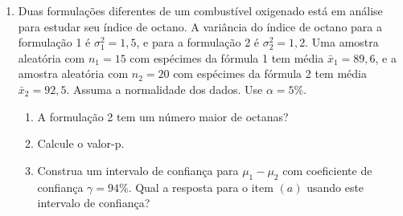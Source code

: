 \documentclass[8pt, a4paper]{article}
\begin{document}
\begin{enumerate}
	\item Duas formulações diferentes de um combustível oxigenado está em análise para estudar seu índice de octano. A variância  do índice de octano para a formulação 1 é $\sigma_1^2 = 1,5$, e para a formulação 2 é $\sigma_2^2 = 1,2$. Uma amostra aleatória com $n_1=15$ com espécimes da fórmula 1 tem média $\bar{x}_1 = 89,6$, e a amostra aleatória com $n_2=20$ com espécimes da fórmula 2 tem média $\bar{x}_2 = 92,5$. Assuma a normalidade dos dados. Use $\alpha=5\%$.
	\begin{enumerate}
		\item A formulação 2 tem um número maior de octanas? 
		\item Calcule o valor-p.
		\item Construa um intervalo de confiança para $\mu_1 - \mu_2$ com coeficiente de confiança $\gamma=94\%$. Qual a resposta para o item $(a)$ usando este intervalo de confiança?
	\end{enumerate}


\end{enumerate}
\end{document}

